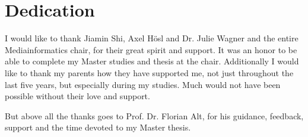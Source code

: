 
\section*{Dedication}


I would like to thank Jiamin Shi, Axel H{\"o}sl and Dr. Julie Wagner and the entire Mediainformatics chair, for their great spirit and support. It was an honor to be able to complete my Master studies and thesis at the chair. Additionally I would like to thank my parents how they have supported me, not just throughout the last five years, but especially during my studies. Much would not have been possible without their love and support. 

But above all the thanks goes to Prof. Dr. Florian Alt, for his guidance, feedback, support and the time devoted to my Master thesis.
